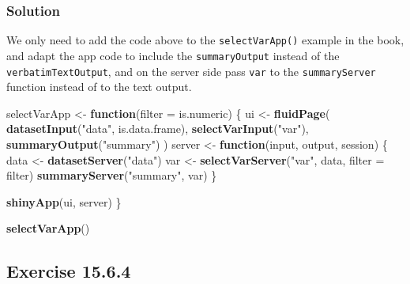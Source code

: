 \documentclass[]{book}
\newenvironment{Shaded}{\begin{snugshade}}{\end{snugshade}}
\newcommand{\ControlFlowTok}[1]{\textcolor[rgb]{0.13,0.29,0.53}{\textbf{#1}}}
\newcommand{\DataTypeTok}[1]{\textcolor[rgb]{0.13,0.29,0.53}{#1}}
\newcommand{\KeywordTok}[1]{\textcolor[rgb]{0.13,0.29,0.53}{\textbf{#1}}}
\newcommand{\NormalTok}[1]{#1}
\newcommand{\StringTok}[1]{\textcolor[rgb]{0.31,0.60,0.02}{#1}}
\begin{document}
\begin{solution}

\hypertarget{solution-2}{%
\subsubsection*{Solution}\label{solution-2}}

We only need to add the code above to the \texttt{selectVarApp()} example in the book, and adapt the app code to include the \texttt{summaryOutput} instead of the \texttt{verbatimTextOutput}, and on the server side pass \texttt{var} to the \texttt{summaryServer} function instead of to the text output.

\begin{Shaded}
\begin{Highlighting}[]
\NormalTok{selectVarApp <-}\StringTok{ }\ControlFlowTok{function}\NormalTok{(}\DataTypeTok{filter =}\NormalTok{ is.numeric) \{}
\NormalTok{    ui <-}\StringTok{ }\KeywordTok{fluidPage}\NormalTok{(}
        \KeywordTok{datasetInput}\NormalTok{(}\StringTok{"data"}\NormalTok{, is.data.frame),}
        \KeywordTok{selectVarInput}\NormalTok{(}\StringTok{"var"}\NormalTok{),}
        \KeywordTok{summaryOutput}\NormalTok{(}\StringTok{"summary"}\NormalTok{)}
\NormalTok{    )}
\NormalTok{    server <-}\StringTok{ }\ControlFlowTok{function}\NormalTok{(input, output, session) \{}
\NormalTok{        data <-}\StringTok{ }\KeywordTok{datasetServer}\NormalTok{(}\StringTok{"data"}\NormalTok{)}
\NormalTok{        var <-}\StringTok{ }\KeywordTok{selectVarServer}\NormalTok{(}\StringTok{"var"}\NormalTok{, data, }\DataTypeTok{filter =}\NormalTok{ filter)}
        \KeywordTok{summaryServer}\NormalTok{(}\StringTok{"summary"}\NormalTok{, var)}
\NormalTok{    \}}

    \KeywordTok{shinyApp}\NormalTok{(ui, server)}
\NormalTok{\}}

\KeywordTok{selectVarApp}\NormalTok{()}
\end{Highlighting}
\end{Shaded}

\end{solution}

\hypertarget{exercise-15.6.4}{%
\subsection*{Exercise 15.6.4}\label{exercise-15.6.4}}
\end{document}
